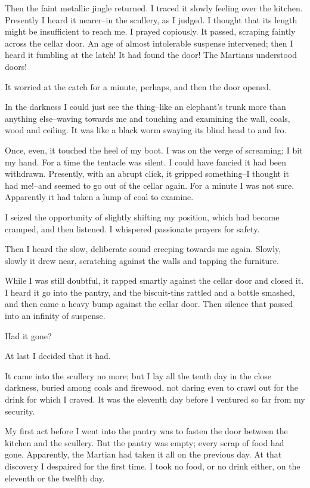 Then the faint metallic jingle returned. I traced it slowly feeling
over the kitchen. Presently I heard it nearer--in the scullery, as
I judged. I thought that its length might be insufficient to reach
me. I prayed copiously. It passed, scraping faintly across the
cellar door. An age of almost intolerable suspense intervened; then
I heard it fumbling at the latch! It had found the door! The
Martians understood doors!

It worried at the catch for a minute, perhaps, and then the door
opened.

In the darkness I could just see the thing--like an elephant's
trunk more than anything else--waving towards me and touching and
examining the wall, coals, wood and ceiling. It was like a black
worm swaying its blind head to and fro.

Once, even, it touched the heel of my boot. I was on the verge of
screaming; I bit my hand. For a time the tentacle was silent. I
could have fancied it had been withdrawn. Presently, with an abrupt
click, it gripped something--I thought it had me!--and seemed to go
out of the cellar again. For a minute I was not sure. Apparently it
had taken a lump of coal to examine.

I seized the opportunity of slightly shifting my position, which
had become cramped, and then listened. I whispered passionate
prayers for safety.

Then I heard the slow, deliberate sound creeping towards me again.
Slowly, slowly it drew near, scratching against the walls and
tapping the furniture.

While I was still doubtful, it rapped smartly against the cellar
door and closed it. I heard it go into the pantry, and the
biscuit-tins rattled and a bottle smashed, and then came a heavy
bump against the cellar door. Then silence that passed into an
infinity of suspense.

Had it gone?

At last I decided that it had.

It came into the scullery no more; but I lay all the tenth day in
the close darkness, buried among coals and firewood, not daring
even to crawl out for the drink for which I craved. It was the
eleventh day before I ventured so far from my security.

My first act before I went into the pantry was to fasten the door
between the kitchen and the scullery. But the pantry was empty;
every scrap of food had gone. Apparently, the Martian had taken it
all on the previous day. At that discovery I despaired for the
first time. I took no food, or no drink either, on the eleventh or
the twelfth day.

